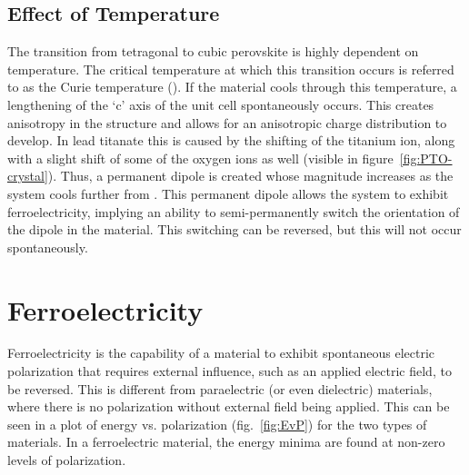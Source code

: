 
\subsection{Effect of Temperature}

The transition from tetragonal to cubic perovskite is highly dependent on temperature. The critical temperature at which this transition occurs is referred to as the Curie temperature (\Tc{}). If the material cools through this temperature, a lengthening of the `c' axis of the unit cell spontaneously occurs. This creates anisotropy in the structure and allows for an anisotropic charge distribution to develop. In lead titanate this is caused by the shifting of the titanium ion, along with a slight shift of some of the oxygen ions as well (visible in figure~\vref{fig:PTO-crystal}). Thus, a permanent dipole is created whose magnitude increases as the system cools further from \Tc{}. This permanent dipole allows the system to exhibit ferroelectricity, implying an ability to semi-permanently switch the orientation of the dipole in the material. This switching can be reversed, but this will not occur spontaneously. 



\section{Ferroelectricity}
\label{sec:Materials-Ferro}

Ferroelectricity is the capability of a material to exhibit spontaneous electric polarization that requires external influence, such as an applied electric field, to be reversed. This is different from paraelectric (or even dielectric) materials, where there is no polarization without external field being applied. This can be seen in a plot of energy vs. polarization (fig.~\vref{fig:EvP}) for the two types of materials. In a ferroelectric material, the energy minima are found at non-zero levels of polarization. 

